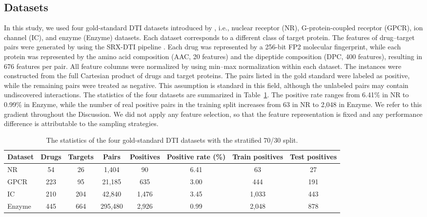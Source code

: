 \documentclass[pdflatex,sn-basic]{sn-jnl}
\begin{document}
\subsection{Datasets}
In this study, we used four gold-standard DTI datasets introduced by
\citet{yamanishi2008prediction}, i.e., nuclear receptor (NR),
G-protein-coupled receptor (GPCR), ion channel (IC), and enzyme (Enzyme)
datasets. Each dataset corresponds to a different class of target
protein. The features of drug--target pairs were generated by using the
SRX-DTI pipeline \citep{khojasteh2023improving}. Each drug was
represented by a 256-bit FP2 molecular fingerprint, while each protein
was represented by the amino acid composition (AAC, 20 features) and the
dipeptide composition (DPC, 400 features), resulting in 676 features per
pair. All feature columns were normalized by using min--max normalization
within each dataset. The instances were constructed from the full
Cartesian product of drugs and target proteins. The pairs listed in the
gold standard were labeled as positive, while the remaining pairs were
treated as negative. This assumption is standard in this field, although
the unlabeled pairs may contain undiscovered interactions. The statistics
of the four datasets are summarized in Table~\ref{tab:datasets}. The
positive rate ranges from 6.41\% in NR to 0.99\% in Enzyme, while the
number of real positive pairs in the training split increases from 63 in
NR to 2{,}048 in Enzyme. We refer to this gradient throughout the
Discussion. We did not apply any feature selection, so that the feature
representation is fixed and any performance difference is attributable
to the sampling strategies.

\begin{table}[htbp]
\centering
\caption{The statistics of the four gold-standard DTI datasets with the
stratified 70/30 split.}
\label{tab:datasets}
\setlength{\tabcolsep}{4pt}%
\footnotesize
\begin{tabular}{lccccccc}
\toprule
Dataset & Drugs & Targets & Pairs & Positives & Positive rate (\%) & Train positives & Test positives \\
\midrule
NR & 54 & 26 & 1,404 & 90 & 6.41 & 63 & 27 \\
GPCR & 223 & 95 & 21,185 & 635 & 3.00 & 444 & 191 \\
IC & 210 & 204 & 42,840 & 1,476 & 3.45 & 1,033 & 443 \\
Enzyme & 445 & 664 & 295,480 & 2,926 & 0.99 & 2,048 & 878 \\
\bottomrule
\end{tabular}
\end{table}
\end{document}
